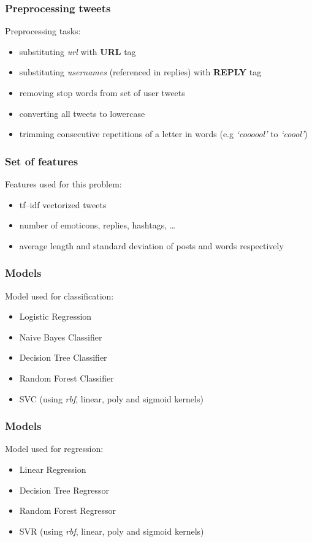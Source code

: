 \documentclass[utf8]{beamer}
\begin{document}
\begin{frame}
	\frametitle{Preprocessing tweets}
	Preprocessing tasks:
	\pause
	\begin{itemize}
		\item substituting \textit{url} with \textbf{URL} tag
		\item substituting \textit{usernames} (referenced in replies) with \textbf{REPLY} tag
		\item removing stop words from set of user tweets
		\item converting all tweets to lowercase
		\item trimming consecutive repetitions of a letter in words (e.g \textit{`coooool'} to \textit{`coool'})
	\end{itemize}
\end{frame}

\begin{frame}
	\frametitle{Set of features}
	Features used for this problem:
	\pause
	\begin{itemize}
		\item tf--idf vectorized tweets
		\item number of emoticons, replies, hashtags, \ldots
		\item average length and standard deviation of posts and words respectively
	\end{itemize}
\end{frame}


\begin{frame}
	\frametitle{Models}
	Model used for classification:
	\pause
	\begin{itemize}
		\item Logistic Regression
		\item Naive Bayes Classifier
		\item Decision Tree Classifier
		\item Random Forest Classifier
		\item SVC (using \textit{rbf}, linear, poly and sigmoid kernels)
	\end{itemize}
\end{frame}


\begin{frame}
	\frametitle{Models}
	Model used for regression:
	\pause
	\begin{itemize}
		\item Linear Regression
		\item Decision Tree Regressor
		\item Random Forest Regressor
		\item SVR (using \textit{rbf}, linear, poly and sigmoid kernels)
	\end{itemize}
\end{frame}
\end{document}
